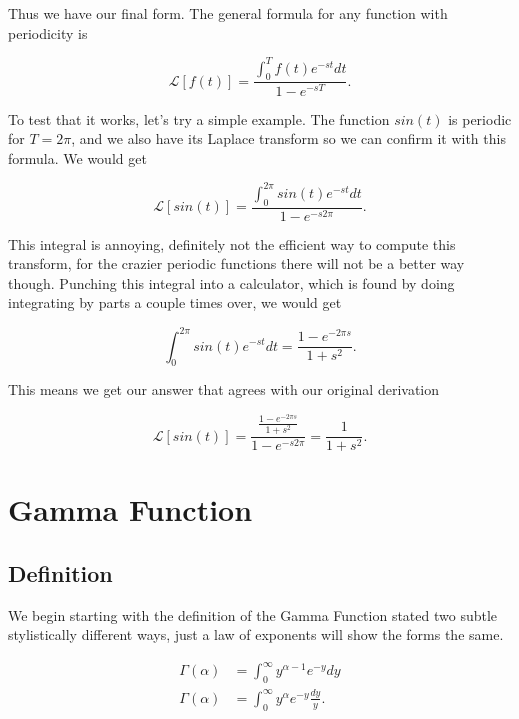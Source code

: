 \documentclass[12pt]{article}
\newcommand{\lp}{\mathscr{L}}
\begin{document}
Thus we have our final form. The general formula for any function with periodicity is 

\begin{equation*}
    \lp[f(t)]=\frac{\int_{0}^{T} f(t) e^{-st} dt}{1-e^{-sT}}.
\end{equation*}

To test that it works, let's try a simple example. The function $sin(t)$ is periodic for $T=2\pi$, and we also have its Laplace transform so we can confirm it with this formula. We would get

\begin{equation*}
    \lp[sin(t)]=\frac{\int_{0}^{2\pi} sin(t) e^{-st} dt}{1-e^{-s2\pi}}.
\end{equation*}

This integral is annoying, definitely not the efficient way to compute this transform, for the crazier periodic functions there will not be a better way though. Punching this integral into a calculator, which is found by doing integrating by parts a couple times over, we would get 

\begin{equation*}
    \int_{0}^{2\pi} sin(t) e^{-st} dt= \frac{1-e^{-2\pi s}}{1+s^2}.
\end{equation*}

This means we get our answer that agrees with our original derivation

\begin{equation*}
    \lp[sin(t)]=\frac{\frac{1-e^{-2\pi s}}{1+s^2}}{1-e^{-s2\pi}}=\frac{1}{1+s^2}.
\end{equation*}

\section{Gamma Function}

\subsection{Definition}

We begin starting with the definition of the Gamma Function stated two subtle stylistically different ways, just a law of exponents will show the forms the same.

\begin{align*}
    \Gamma(\alpha)&=\int_{0}^{\infty}y^{\alpha-1}e^{-y}dy \\
    \Gamma(\alpha)&=\int_{0}^{\infty}y^{\alpha}e^{-y}\frac{dy}{y}.
\end{align*}
\end{document}
